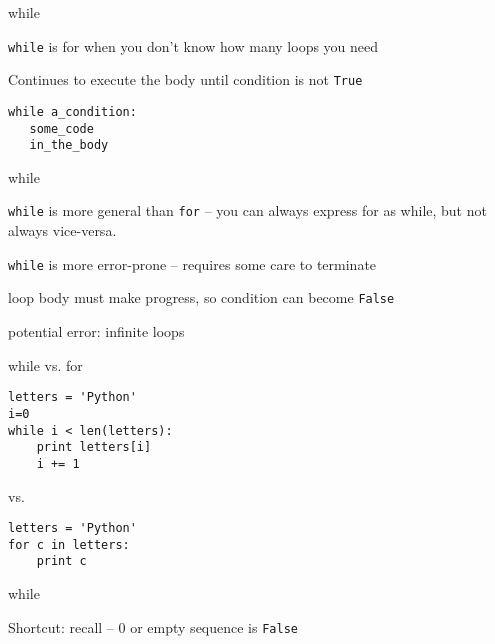 \documentclass{beamer}
\begin{document}
\begin{frame}[fragile]{while}

{\Large \verb|while| is for when you don't know how many loops you need}

\vfill
{\Large Continues to execute the body until condition is not \verb|True|}

\begin{verbatim}
while a_condition:
   some_code
   in_the_body
\end{verbatim}
\end{frame}



\begin{frame}[fragile]{while}

{\Large \verb|while| is more general than \verb|for| -- 
you can always express for as while,
but not always vice-versa.}

\vfill

{\Large \verb|while| is more error-prone -- requires some care to terminate}

\vfill
{\Large  loop body must make progress, so condition can become \verb|False| }

\vfill
{\Large  potential error: infinite loops }
\end{frame}



\begin{frame}[fragile]{while vs. for}

\begin{verbatim}
letters = 'Python'
i=0
while i < len(letters):
    print letters[i]
    i += 1
\end{verbatim}
vs.
\begin{verbatim}
letters = 'Python'
for c in letters:
    print c
\end{verbatim}

\end{frame}


\begin{frame}[fragile]{while}

{\Large Shortcut: recall -- 0 or empty sequence is \verb|False| }


\end{frame}
\end{document}
